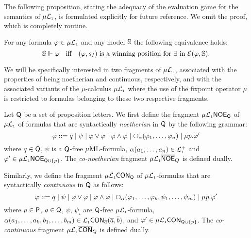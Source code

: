 The following proposition, 
stating the adequacy of the evaluation game for the semantics of $\mu\mathcal{L}_{\scriptscriptstyle 1}$,
is formulated explicitly for future reference.
We omit the proof, which is completely routine.

\begin{fact}[Adequacy]
\label{f:adeqmu}
For any formula $\varphi \in \mu\mathcal{L}_{\scriptscriptstyle 1}$ and any model $\mathbb{S}$ the following 
equivalence holds:
\[
\model \mmodels \phi
\quad\text{iff}\quad 
(\phi,s_{I}) \text{ is a winning position for $\eloise$ in } 
\egame(\varphi,\model).
\]
\end{fact}

We will be specifically interested in two fragments of $\mu\mathcal{L}_{\scriptscriptstyle 1}$, associated 
with the properties of being noetherian and continuous, respectively, and with 
the associated variants of the $\mu$-calculus $\mu\mathcal{L}_{\scriptscriptstyle 1}$ where the use of the 
fixpoint operator $\mu$ is restricted to formulas belonging to these two
respective fragments.

\begin{definition}
Let $\mathsf{Q}$ be a set  of proposition letters.
We first define the fragment $\mu\mathcal{L}_{\scriptscriptstyle 1}\mathsf{NOE}_{\mathsf{Q}}$ of $\mu\mathcal{L}_{\scriptscriptstyle 1}$ of 
formulas that are syntactically \emph{noetherian} in $\mathsf{Q}$ by the following 
grammar:
\begin{equation*}
   \varphi ::= q
   \mid \psi
   \mid \varphi \lor \varphi
   \mid \varphi \land \varphi
   \mid \nxt{\al}(\varphi_{1},\ldots,\varphi_{n})
   \mid \mu p.\phi'
\end{equation*}
where $q \in \mathsf{Q}$, $\psi$ is a $\mathsf{Q}$-free $\mu\mathrm{ML}$-formula,
$\alpha(a_{1},\ldots,a_{n}) \in \mathcal{L}_{\scriptscriptstyle 1}^{+}$ and 
$\varphi' \in \mu\mathcal{L}_{\scriptscriptstyle 1}\mathsf{NOE}_{\mathsf{Q}\cup\{p\}}$. 
The \emph{co-noetherian} fragment $\mu\mathcal{L}_{\scriptscriptstyle 1}\overline{\mathsf{NOE}}_{Q}$ is defined dually.

Similarly, we define the fragment $\mu\mathcal{L}_{\scriptscriptstyle 1}\mathsf{CON}_{\mathsf{Q}}$ of 
$\mu\mathcal{L}_{\scriptscriptstyle 1}$-formulas that are syntactically \emph{continuous} in $\mathsf{Q}$ as
follows:
\begin{equation*}
   \varphi ::= q
   \mid \psi
   \mid \varphi \lor \varphi
   \mid \varphi \land \varphi
   \mid 
   \nxt{\al}(\varphi_{1},\ldots,\varphi_{k},\psi_{1},\ldots,\psi_{m})
   \mid \mu p.\phi'
\end{equation*}
where $p\in\mathsf{P}$, $q \in \mathsf{Q}$, $\psi$, $\psi_{i}$ are $\mathsf{Q}$-free 
$\mu\mathcal{L}_{\scriptscriptstyle 1}$-formula, $\alpha(a_{1},\ldots,a_{k},b_{1},\ldots,b_{m}) \in 
\mathcal{L}_{\scriptscriptstyle 1}\mathsf{CON}_{\overline{a}}(\overline{a},\overline{b})$,
and $\varphi' \in \mu\mathcal{L}_{\scriptscriptstyle 1}\mathsf{CON}_{\mathsf{Q}\cup\{p\}}$. 
The \emph{co-continuous} fragment $\mu\mathcal{L}_{\scriptscriptstyle 1}\overline{\mathsf{CON}}_{Q}$ is defined dually.
\end{definition}

